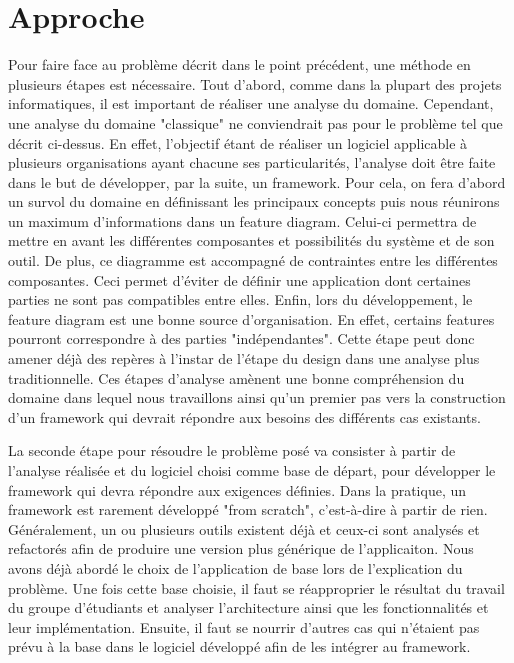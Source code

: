 \section{Approche}

Pour faire face au problème décrit dans le point précédent,  une méthode en plusieurs étapes est nécessaire.  
Tout d'abord,  comme dans la plupart des projets informatiques,  il est important de réaliser une analyse du domaine.  Cependant,  une analyse du domaine "classique" ne conviendrait pas pour le problème tel que décrit ci-dessus.  En effet,  l'objectif étant de réaliser un logiciel applicable à plusieurs organisations ayant chacune ses particularités,  l'analyse doit être faite dans le but de développer,  par la suite,  un framework.  Pour cela,  on fera d'abord un survol du domaine en définissant les principaux concepts puis  nous réunirons un maximum d'informations dans un feature diagram.  Celui-ci permettra de mettre en avant les différentes composantes et possibilités du système et de son outil.  De plus,  ce diagramme est accompagné de contraintes entre les différentes composantes.  Ceci permet d'éviter de définir une application dont certaines parties ne sont pas compatibles entre elles.  Enfin,  lors du développement,  le feature diagram est une bonne source d'organisation.  En effet,  certains features pourront correspondre à des parties "indépendantes".  Cette étape peut donc amener déjà des repères à l'instar de l'étape du design dans une analyse plus traditionnelle.
Ces étapes d'analyse amènent une bonne compréhension du domaine dans lequel nous travaillons ainsi qu'un premier pas vers la construction d'un framework qui devrait répondre aux besoins des différents cas existants.  

La seconde étape pour résoudre le problème posé va consister à partir de l'analyse réalisée et du logiciel choisi comme base de départ,  pour développer le framework qui devra répondre aux exigences définies.  Dans la pratique,  un framework est rarement développé "from scratch",  c'est-à-dire à partir de rien.  Généralement,  un ou plusieurs outils existent déjà et ceux-ci sont analysés et refactorés afin de produire une version plus générique de l'applicaiton.  Nous avons déjà abordé le choix de l'application de base lors de l'explication du problème.  Une fois cette base choisie,  il faut se réapproprier le résultat du travail du groupe d'étudiants et analyser l'architecture ainsi que les fonctionnalités et leur implémentation.  Ensuite,  il faut se nourrir d'autres cas qui n'étaient pas prévu à la base dans le logiciel développé afin de les intégrer au framework.

